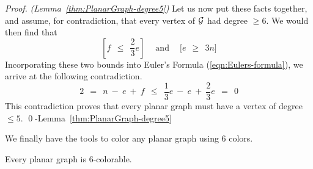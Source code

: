 \begin{proof} {\em (Lemma~\ref{thm:PlanarGraph-degree5})}
Let us now put these facts together, and assume, for contradiction, that every vertex of $\mbox{$\cal G$}$ had degree $\geq 6$.  We would then find that
\[ \left[ f \ \ \leq \ \ \frac{2}{3} e \right] \ \ \ \ \mbox{ and } \ \ \ \ \Big[ e \ \ \geq \ \ 3n \Big] \]
Incorporating these two bounds into Euler's Formula (\ref{eqn:Eulers-formula}), we arrive at the following contradiction.
\[ 2 \ \ = \ \ n \ - \ e \  + \ f \ \ \leq \ \ \frac{1}{3} e \ - \ e \ + \ \frac{2}{3} e \ \ = \ \ 0 \]
This contradiction proves that every planar graph must have a vertex of degree $\leq 5$.
 \qed-Lemma~\ref{thm:PlanarGraph-degree5}
\end{proof}

\medskip

We finally have the tools to color any planar graph using $6$ colors.


\begin{prop}
\label{thm:P-6-colorability}
Every planar graph is $6$-colorable.
\end{prop}


